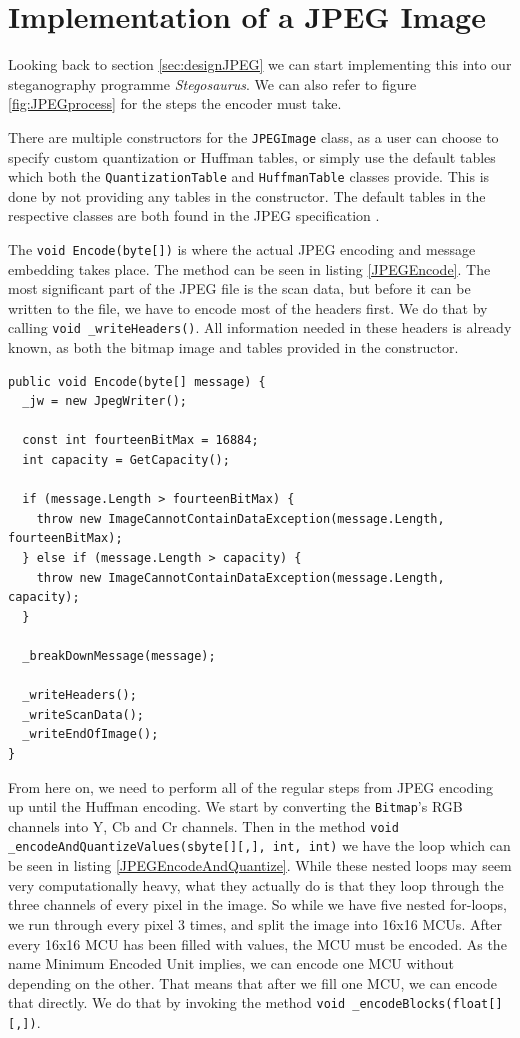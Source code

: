 \section{Implementation of a JPEG Image}
Looking back to section \ref{sec:designJPEG} we can start implementing this into our steganography programme \textit{Stegosaurus}.
We can also refer to figure \ref{fig:JPEGprocess} for the steps the encoder must take.

There are multiple constructors for the \lstinline|JPEGImage| class, as a user can choose to specify custom quantization or Huffman tables, or simply use the default tables which both the \lstinline|QuantizationTable| and \lstinline|HuffmanTable| classes provide. 
This is done by not providing any tables in the constructor.
The default tables in the respective classes are both found in the JPEG specification \citep[Annex k]{JPEGStandard}.

The \lstinline|void Encode(byte[])| is where the actual JPEG encoding and message embedding takes place.
The method can be seen in listing \ref{JPEGEncode}.
The most significant part of the JPEG file is the scan data, but before it can be written to the file, we have to encode most of the headers first.
We do that by calling \lstinline|void _writeHeaders()|.
All information needed in these headers is already known, as both the bitmap image and tables provided in the constructor.

\begin{lstlisting}[firstnumber=141,label=JPEGEncode, caption={\lstinline|JPEGImage.Encode| method \textbf{File: }JPEGImage.cs}]
public void Encode(byte[] message) {
  _jw = new JpegWriter();

  const int fourteenBitMax = 16884;
  int capacity = GetCapacity();

  if (message.Length > fourteenBitMax) {
    throw new ImageCannotContainDataException(message.Length, fourteenBitMax);
  } else if (message.Length > capacity) {
    throw new ImageCannotContainDataException(message.Length, capacity);
  }

  _breakDownMessage(message);

  _writeHeaders();
  _writeScanData();
  _writeEndOfImage();
}
\end{lstlisting}

From here on, we need to perform all of the regular steps from JPEG encoding up until the Huffman encoding.
We start by converting the \lstinline|Bitmap|'s RGB channels into Y, Cb and Cr channels. Then in the method \lstinline|void _encodeAndQuantizeValues(sbyte[][,], int, int)| we have the loop which can be seen in listing \ref{JPEGEncodeAndQuantize}.
While these nested loops may seem very computationally heavy, what they actually do is that they loop through the three channels of every pixel in the image.
So while we have five nested for-loops, we run through every pixel 3 times, and split the image into 16x16 MCUs.
After every 16x16 MCU has been filled with values, the MCU must be encoded.
As the name Minimum Encoded Unit implies, we can encode one MCU without depending on the other.
That means that after we fill one MCU, we can encode that directly.
We do that by invoking the method \lstinline|void _encodeBlocks(float[][,])|.

